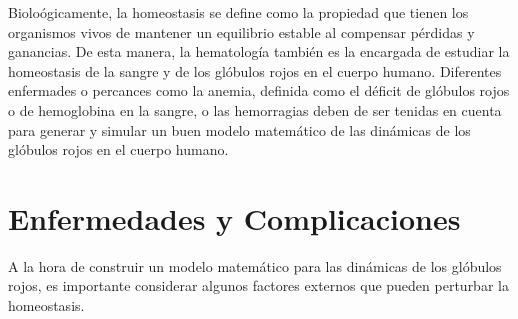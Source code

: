 Bioloógicamente, la homeostasis se define como la propiedad que tienen los organismos vivos de mantener un equilibrio estable al compensar pérdidas y ganancias. De esta manera, la hematología también es la encargada de estudiar la homeostasis de la sangre y de los glóbulos rojos en el cuerpo humano. Diferentes enfermades o percances como la anemia, definida como el déficit de glóbulos rojos o de hemoglobina en la sangre, o las hemorragias deben de ser tenidas en cuenta para generar y simular un buen modelo matemático de las dinámicas de los glóbulos rojos en el cuerpo humano.

\section{Enfermedades y Complicaciones}\label{sec:RBC:enfermedades}

A la hora de construir un modelo matemático para las dinámicas de los glóbulos rojos, es importante considerar algunos factores externos que pueden perturbar la homeostasis. 